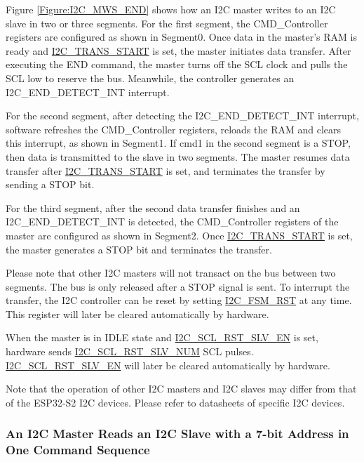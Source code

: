 \documentclass[main\_\_EN.tex]{subfiles}
\begin{document}
Figure \ref{Figure:I2C_MWS_END} shows how an I2C master writes to an I2C slave in two or three segments. For the first segment, the CMD\_Controller registers are configured as shown in Segment0. Once data in the master’s RAM is ready and \hyperref[fielddesc:I2CTRANSSTART]{I2C\_TRANS\_START} is set, the master initiates data transfer. After executing the END command, the master turns off the SCL clock and pulls the SCL low to reserve the bus. Meanwhile, the controller generates an I2C\_END\_DETECT\_INT interrupt.

For the second segment, after detecting the I2C\_END\_DETECT\_INT interrupt, software refreshes the CMD\_Controller registers, reloads the RAM and clears this interrupt, as shown in Segment1. If cmd1 in the second segment is a STOP, then data is transmitted to the slave in two segments. The master resumes data transfer after \hyperref[fielddesc:I2CTRANSSTART]{I2C\_TRANS\_START} is set, and terminates the transfer by sending a STOP bit.

For the third segment, after the second data transfer finishes and an I2C\_END\_DETECT\_INT is detected, the CMD\_Controller registers of the master are configured as shown in Segment2. Once \hyperref[fielddesc:I2CTRANSSTART]{I2C\_TRANS\_START} is set, the master generates a STOP bit and terminates the transfer.

Please note that other I2C masters will not transact on the bus between two segments. The bus is only released after a STOP signal is sent. To interrupt the transfer, the I2C controller can be reset by setting \hyperref[fielddesc:I2CFSMRST]{I2C\_FSM\_RST} at any time. This register will later be cleared automatically by hardware.

When the master is in IDLE state and \hyperref[fielddesc:I2CSCLRSTSLVEN]{I2C\_SCL\_RST\_SLV\_EN} is set, hardware sends \hyperref[fielddesc:I2CSCLRSTSLVNUM]{I2C\_SCL\_RST\_SLV\_NUM} SCL pulses. \hyperref[fielddesc:I2CSCLRSTSLVEN]{I2C\_SCL\_RST\_SLV\_EN} will later be cleared automatically by hardware.

Note that the operation of other I2C masters and I2C slaves may differ from that of the ESP32-S2 I2C devices. Please refer to datasheets of specific I2C devices.

\subsubsection{An I2C Master Reads an I2C Slave with a 7-bit Address in One Command Sequence}
\end{document}
